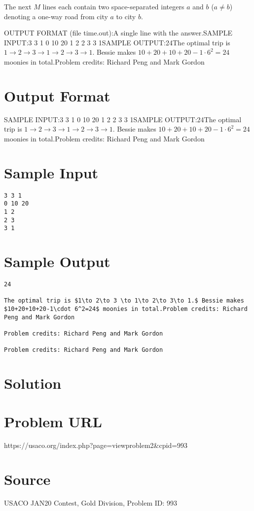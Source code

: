 \documentclass[12pt]{article}
\begin{document}
The next $M$ lines each contain two space-separated integers $a$ and $b$
($a\neq b$) denoting a one-way road from city $a$ to city $b$.

OUTPUT FORMAT (file time.out):A single line with the answer.SAMPLE INPUT:3 3 1
0 10 20
1 2
2 3
3 1SAMPLE OUTPUT:24The optimal trip is $1\to 2\to 3 \to 1\to 2\to 3\to 1.$ Bessie makes 
$10+20+10+20-1\cdot 6^2=24$ moonies in total.Problem credits: Richard Peng and Mark Gordon

\section*{Output Format}
SAMPLE INPUT:3 3 1
0 10 20
1 2
2 3
3 1SAMPLE OUTPUT:24The optimal trip is $1\to 2\to 3 \to 1\to 2\to 3\to 1.$ Bessie makes 
$10+20+10+20-1\cdot 6^2=24$ moonies in total.Problem credits: Richard Peng and Mark Gordon

\section*{Sample Input}
\begin{verbatim}
3 3 1
0 10 20
1 2
2 3
3 1
\end{verbatim}

\section*{Sample Output}
\begin{verbatim}
24

The optimal trip is $1\to 2\to 3 \to 1\to 2\to 3\to 1.$ Bessie makes 
$10+20+10+20-1\cdot 6^2=24$ moonies in total.Problem credits: Richard Peng and Mark Gordon

Problem credits: Richard Peng and Mark Gordon

Problem credits: Richard Peng and Mark Gordon
\end{verbatim}

\section*{Solution}


\section*{Problem URL}
https://usaco.org/index.php?page=viewproblem2&cpid=993

\section*{Source}
USACO JAN20 Contest, Gold Division, Problem ID: 993
\end{document}
